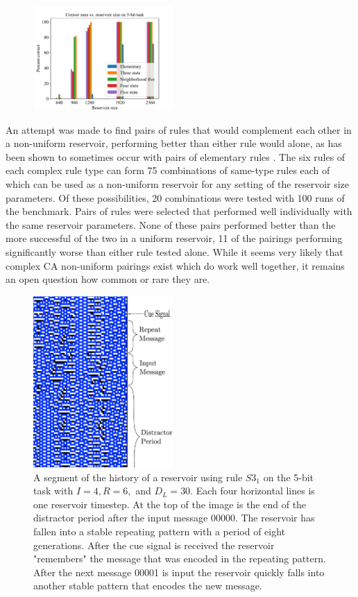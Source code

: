 \documentclass{elsarticle}
\begin{document}
\begin{multicols}{2}
        \begin{figure}[H]
                \centering
                \includegraphics[width=0.475\textwidth]{bar.pdf}
        \end{figure}

	An attempt was made to find pairs of rules that would complement each other in 
	a non-uniform reservoir, performing better than either rule would alone, as has 
	been shown to sometimes occur with pairs of elementary rules 
	\cite{nichele2017reservoir}. The six rules of each complex rule type can form 
	75 combinations of same-type rules each of which can be used as a non-uniform 
	reservoir for  any setting of the reservoir size parameters. Of these 
	possibilities, 20 combinations were tested with 100 runs of the benchmark.  
	Pairs of rules were selected that performed well individually with the same 
	reservoir parameters.  None of these pairs performed better than the more 
	successful of the two in a uniform reservoir, 11 of the pairings performing 
	significantly worse than either rule tested alone. While it seems very likely 
	that complex CA non-uniform pairings exist which do work well together, it 
	remains an open question how common or rare they are.
	
	
	\begin{figure}[H]
		\centering
		\includegraphics[width=0.475\textwidth]{RepeatMessage.pdf}
		\caption{A segment of the history of a reservoir using rule $S3_{1}$ on the 
			5-bit task with $I=4, R=6,$ and $D_{L}=30$. Each four horizontal lines is one 
			reservoir timestep. At the top of the image is the end of the distractor 
			period after the input message 00000. The reservoir has fallen into a 
			stable repeating pattern with a period of eight generations. After the 
			cue signal is received the reservoir "remembers" the message that was 
			encoded in the repeating pattern. After the next message 00001 is input 
			the reservoir quickly falls into another stable pattern that encodes the 
		new message.} 
		

\end{figure}
\end{multicols}
\end{document}
